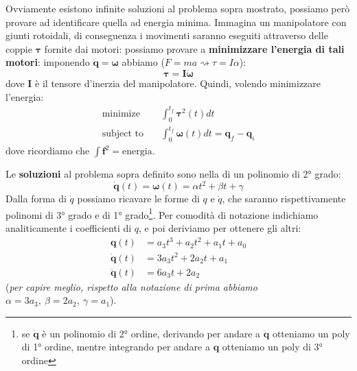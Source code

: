Ovviamente esistono infinite soluzioni al problema sopra mostrato, possiamo però provare ad identificare quella ad energia minima. Immagina un manipolatore con giunti rotoidali, di conseguenza i movimenti saranno eseguiti attraverso delle coppie $\bm{\tau}$ fornite dai motori: possiamo provare a \textbf{minimizzare l'energia di tali motori}: imponendo $\dot{\bm{q}} = \bm{\omega}$ abbiamo ($F = ma \rightsquigarrow \tau = I\alpha$):
$$
\bm{\tau} = \bm{I}\dot{\bm{\omega}}
$$
dove $\bm{I}$ è il tensore d'inerzia del manipolatore. Quindi, volendo minimizzare l'energia:
\begin{align*}
	\text{minimize} \quad & \int_0^{t_f} \bm{\tau}^2(t)dt \\
	\text{subject to} \quad & \int_0^{t_f} \bm{\omega}(t)dt = \bm{q}_f - \bm{q}_i
\end{align*}
dove ricordiamo che $\int \bm{f}^2 = \text{energia}$.

Le \textbf{soluzioni} al problema sopra definito sono nella di un polinomio di 2° grado:
$$
\dot{\bm{q}}(t) = \bm{\omega}(t) = \alpha t^2 + \beta t + \gamma
$$
Dalla forma di $\dot{q}$ possiamo ricavare le forme di $q$ e $\ddot{q}$, che saranno rispettivamente polinomi di 3° grado e di 1° grado\footnote{se $\dot{\bm{q}}$ è un polinomio di 2° ordine, derivando per andare a $\ddot{\bm{q}}$ otteniamo un poly di 1° ordine, mentre integrando per andare a $\bm{q}$ otteniamo un poly di 3° ordine}. Per comodità di notazione indichiamo analiticamente i coefficienti di $q$, e poi deriviamo per ottenere gli altri:
\begin{equation}\label{eq:cubic_sol_traj}
\begin{aligned}
	\bm{q}(t) &= a_3t^3 + a_2t^2 + a_1t + a_0 \\
	\bm{\dot{q}}(t) &= 3a_3t^2 + 2a_2t + a_1 \\
	\bm{\ddot{q}}(t) &= 6a_3t + 2a_2
\end{aligned}
\end{equation}
(\textit{per capire meglio, rispetto alla notazione di prima abbiamo} $\alpha=3a_3, \ \beta = 2a_2, \ \gamma = a_1$).

